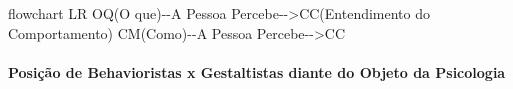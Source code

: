 \documentclass[
]{book}
\newenvironment{Shaded}{\begin{snugshade}}{\end{snugshade}}
\newcommand{\NormalTok}[1]{#1}
\begin{document}
\begin{Shaded}
\begin{Highlighting}[]
\NormalTok{flowchart LR}
\NormalTok{OQ(O que){-}{-}A Pessoa Percebe{-}{-}\textgreater{}CC(Entendimento do Comportamento)}
\NormalTok{CM(Como){-}{-}A Pessoa Percebe{-}{-}\textgreater{}CC}
\end{Highlighting}
\end{Shaded}

\hypertarget{posiuxe7uxe3o-de-behavioristas-x-gestaltistas-diante-do-objeto-da-psicologia}{%
\paragraph{Posição de Behavioristas x Gestaltistas diante do Objeto da Psicologia}\label{posiuxe7uxe3o-de-behavioristas-x-gestaltistas-diante-do-objeto-da-psicologia}}
\end{document}
